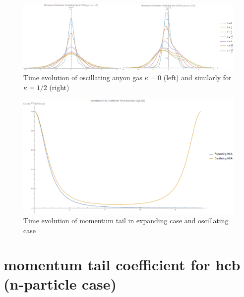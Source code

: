\documentclass[onecolumn,english,aps,pra]{revtex4}
\begin{document}
\begin{center}
\begin{figure}[h]
	\includegraphics[scale=.52]{"../Plots/MomDistOscillatingPair"}
	\caption{Time evolution of oscillating anyon gas $\kappa = 0$ (left) and similarly for $\kappa = 1/2$ (right)} 
	\label{fig:OscHCATimeDepPair}
\end{figure}
\end{center}

\begin{center}
\begin{figure}[h]
	\includegraphics[scale=.4]{"../Plots/MomTailCoeffComparison"}
	\caption{Time evolution of momentum tail in expanding case and oscillating case} 
	\label{fig:MomTailCoeffComp}
\end{figure}
\end{center}

\section{momentum tail coefficient for hcb (n-particle case)}
\end{document}
